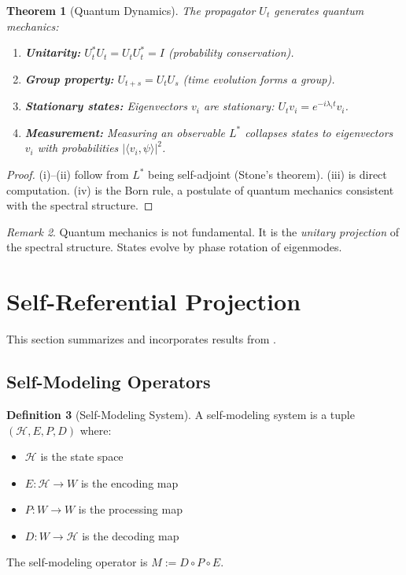 \documentclass[11pt,a4paper]{article}
\theoremstyle{plain}
\newtheorem{theorem}{Theorem}[section]
\theoremstyle{definition}
\newtheorem{definition}[theorem]{Definition}
\theoremstyle{remark}
\newtheorem{remark}[theorem]{Remark}
\newcommand{\Hilbert}{\mathcal{H}}
\newcommand{\Laplacian}{L^*}
\newcommand{\ip}[2]{\langle #1, #2 \rangle}
\begin{document}
\begin{theorem}[Quantum Dynamics]\label{thm:quantum}
The propagator $U_t$ generates quantum mechanics:
\begin{enumerate}[label=(\roman*),noitemsep]
    \item \textbf{Unitarity:} $U_t^* U_t = U_t U_t^* = I$ (probability conservation).
    \item \textbf{Group property:} $U_{t+s} = U_t U_s$ (time evolution forms a group).
    \item \textbf{Stationary states:} Eigenvectors $v_i$ are stationary: $U_t v_i = e^{-i\lambda_i t} v_i$.
    \item \textbf{Measurement:} Measuring an observable $\Laplacian$ collapses states to eigenvectors $v_i$ with probabilities $|\ip{v_i}{\psi}|^2$.
\end{enumerate}
\end{theorem}

\begin{proof}
(i)--(ii) follow from $\Laplacian$ being self-adjoint (Stone's theorem). (iii) is direct computation. (iv) is the Born rule, a postulate of quantum mechanics consistent with the spectral structure.
\end{proof}

\begin{remark}
Quantum mechanics is not fundamental. It is the \emph{unitary projection} of the spectral structure. States evolve by phase rotation of eigenmodes.
\end{remark}

\section{Self-Referential Projection}

This section summarizes and incorporates results from \cite{bsc2026sat, bsc2026eb}.

\subsection{Self-Modeling Operators}

\begin{definition}[Self-Modeling System]\label{def:selfmodel}
A self-modeling system is a tuple $(\Hilbert, E, P, D)$ where:
\begin{itemize}[noitemsep]
    \item $\Hilbert$ is the state space
    \item $E : \Hilbert \to W$ is the encoding map
    \item $P : W \to W$ is the processing map
    \item $D : W \to \Hilbert$ is the decoding map
\end{itemize}
The self-modeling operator is $M := D \circ P \circ E$.
\end{definition}
\end{document}
